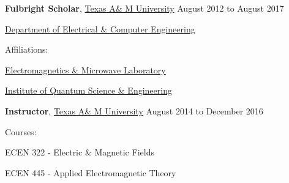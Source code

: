 \documentclass[10pt]{article}
\newcommand{\halfblankline}{\quad\vspace{-0.5\baselineskip}\pagebreak[3]}
\begin{document}
\halfblankline

\textbf{Fulbright Scholar},
            \href{http://www.tamu.edu/}{Texas A\& M University}
            \hfill {August 2012 to August 2017}
\begin{innerlist}

    \item[] \href{http://engineering.tamu.edu/electrical}{Department of Electrical \& Computer Engineering}
    \begin{innerlist}
        \item Affiliations:
            \begin{innerlist}
                \item[] \href{http://ee.tamu.edu/~eml/}{Electromagnetics \& Microwave Laboratory}
                \item[] \href{http://iqse.tamu.edu/}{Institute of Quantum Science \& Engineering}
            \end{innerlist}
    \end{innerlist}

\end{innerlist}


\halfblankline

\textbf{Instructor},
            \href{http://www.tamu.edu/}{Texas A\& M University}
            \hfill {August 2014 to December 2016}
\begin{innerlist}
        \item Courses:
            \begin{innerlist}
                \item[] {ECEN 322 - Electric \& Magnetic Fields}
                \item[] {ECEN 445 - Applied Electromagnetic Theory}
            \end{innerlist}
\end{innerlist}

\halfblankline
\end{document}
